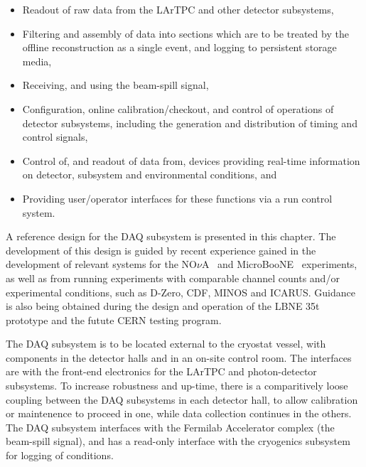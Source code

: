 \begin{itemize}
  \item Readout of raw data from the LArTPC and other detector
    subsystems,

  \item Filtering and assembly of data into sections which are to be
    treated by the offline reconstruction as a single event, and
    logging to persistent storage media,

  \item Receiving, and using the \LBNE beam-spill signal, 

  \item Configuration, online calibration/checkout, and control of 
        operations of detector subsystems, including the generation 
        and distribution of timing and control signals,

  \item Control of, and readout of data from, devices 
        providing real-time information on detector, subsystem 
        and environmental conditions, and  

  \item Providing user/operator interfaces for these functions via 
        a run control system.
\end{itemize}

A reference design for the DAQ subsystem is presented in this chapter.   
The development of this design is guided by recent experience gained 
in the development of relevant systems for the NO$\nu$A~\cite{novatdr} 
and MicroBooNE~\cite{microboonecdr} experiments, as well as from 
running experiments with comparable channel counts and/or experimental 
conditions, such as D-Zero, CDF, MINOS and ICARUS.  Guidance is also
being obtained during the design and operation of the LBNE 35t
prototype and the futute CERN testing program.


The DAQ subsystem is to be located external to the cryostat vessel,
with components in the detector halls and in an on-site control room.
The interfaces are with the front-end electronics for the LArTPC and
photon-detector subsystems.  To increase robustness and up-time, there
is a comparitively loose coupling between the DAQ subsystems in each
detector hall, to allow calibration or maintenence to proceed in one,
while data collection continues in the others.  The DAQ subsystem
interfaces with the Fermilab Accelerator complex (the beam-spill
signal), and has a read-only interface with the cryogenics subsystem
for logging of conditions.  

